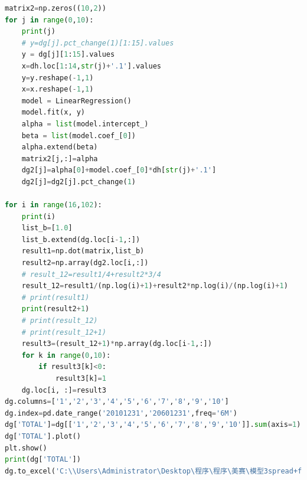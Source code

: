 \documentclass[12pt]{article}
\begin{document}
\begin{appendices}
\begin{lstlisting}[language={python}, caption=\texttt{Modified LVM Model}]
matrix2=np.zeros((10,2))
for j in range(0,10):
    print(j)
    # y=dg[j].pct_change(1)[1:15].values
    y = dg[j][1:15].values
    x=dh.loc[1:14,str(j)+'.1'].values
    y=y.reshape(-1,1)
    x=x.reshape(-1,1)
    model = LinearRegression()
    model.fit(x, y)
    alpha = list(model.intercept_)
    beta = list(model.coef_[0])
    alpha.extend(beta)
    matrix2[j,:]=alpha
    dg2[j]=alpha[0]+model.coef_[0]*dh[str(j)+'.1']
    dg2[j]=dg2[j].pct_change(1)

for i in range(16,102):
    print(i)
    list_b=[1.0]
    list_b.extend(dg.loc[i-1,:])
    result1=np.dot(matrix,list_b)
    result2=np.array(dg2.loc[i,:])
    # result_12=result1/4+result2*3/4
    result_12=result1/(np.log(i)+1)+result2*np.log(i)/(np.log(i)+1)
    # print(result1)
    print(result2+1)
    # print(result_12)
    # print(result_12+1)
    result3=(result_12+1)*np.array(dg.loc[i-1,:])
    for k in range(0,10):
        if result3[k]<0:
            result3[k]=1
    dg.loc[i, :]=result3
dg.columns=['1','2','3','4','5','6','7','8','9','10']
dg.index=pd.date_range('20101231','20601231',freq='6M')
dg['TOTAL']=dg[['1','2','3','4','5','6','7','8','9','10']].sum(axis=1)
dg['TOTAL'].plot()
plt.show()
print(dg['TOTAL'])
dg.to_excel('C:\\Users\Administrator\Desktop\程序\程序\美赛\模型3spread+feature\Data\Model_spread+feature(log)(policy).xlsx')
\end{lstlisting}



\end{appendices}
\end{document}

